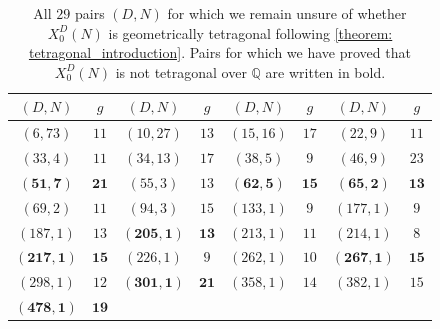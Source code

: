 \documentclass[11pt,reqno]{amsart}
\newcommand{\Q}{\mathbb{Q}}
\theoremstyle{definition}
\begin{document}
{
\begin{longtable}{|c|c||c|c||c|c||c|c|}
\caption{All $29$ pairs $(D,N)$ for which we remain unsure of whether $X_0^D(N)$ is geometrically tetragonal following \cref{theorem: tetragonal_introduction}. Pairs for which we have proved that $X_0^D(N)$ is not tetragonal over $\Q$ are written in bold.}\label{table: remaining_geom_tetragonal_candidates} \\  \hline 
$(D,N)$ & $g$ & $(D,N)$ & $g$ & $(D,N)$ & $g$ & $(D,N)$ & $g$ \\ \hline \hline
$ (6 , 73 )$ & $ 11 $
 & 
$ (10 , 27 )$ & $ 13 $
 & 
$ (15 , 16 )$ & $ 17 $
 & 
$ (22 , 9 )$ & $ 11 $
\\ \hline
$ (33 , 4 )$ & $ 11 $
 & 
$ (34 , 13 )$ & $ 17 $
 &
$ (38 , 5 )$ & $ 9 $
 & 
$ (46 , 9 )$ & $ 23 $
\\ \hline 
$\mathbf{ (51 , 7 )}$ & $\mathbf{ 21 }$
&
$ (55 , 3 )$ & $ 13 $
 & 
$\mathbf{ (62 , 5 )}$ & $\mathbf{ 15 }$
 & 
$\mathbf{ (65 , 2 )}$ & $\mathbf{ 13 }$
\\ \hline
$ (69 , 2 )$ & $ 11 $
 & 
$ (94 , 3 )$ & $ 15 $
 & 
$ (133 , 1 )$ & $ 9 $
 &
$ (177 , 1 )$ & $ 9 $
\\ \hline 
$ (187 , 1 )$ & $ 13 $
 & 
$ \mathbf{(205 , 1 )}$ & $\mathbf{ 13 }$
 &
$ (213 , 1 )$ & $ 11 $
 & 
$ (214 , 1 )$ & $ 8 $
\\ \hline 
$ \mathbf{(217 , 1 )}$ & $ \mathbf{15} $
&
$ (226 , 1 )$ & $ 9 $
 & 
$ (262 , 1 )$ & $ 10 $
 & 
$\mathbf{ (267 , 1 )}$ & $\mathbf{ 15} $
\\ \hline
$ (298 , 1 )$ & $ 12 $
 & 
$\mathbf{ (301 , 1 )}$ & $\mathbf{ 21 }$
 & 
$ (358 , 1 )$ & $ 14 $
 &
$ (382 , 1 )$ & $ 15 $
\\ \hline 
$ \mathbf{(478 , 1 )}$ & $ \mathbf{19} $ & & & & & & \\ \hline
\end{longtable}
}
\end{document}
